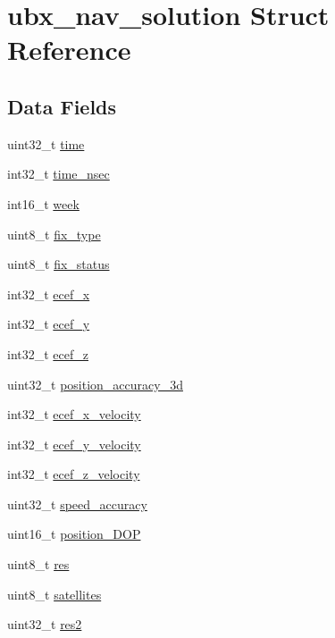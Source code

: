 \hypertarget{structubx__nav__solution}{\section{ubx\+\_\+nav\+\_\+solution Struct Reference}
\label{structubx__nav__solution}
}
\subsection*{Data Fields}
\begin{DoxyCompactItemize}
\item 
uint32\+\_\+t \hyperlink{structubx__nav__solution_aae9f8b563b5be705a41b809bc84149fe}{time}
\item 
int32\+\_\+t \hyperlink{structubx__nav__solution_a4ff7e85c5050ca078e2c3530dc25c5c3}{time\+\_\+nsec}
\item 
int16\+\_\+t \hyperlink{structubx__nav__solution_aebadda223c5339745fb587f467ebed19}{week}
\item 
uint8\+\_\+t \hyperlink{structubx__nav__solution_aca3f0fb879b28009e82b52f00da8876d}{fix\+\_\+type}
\item 
uint8\+\_\+t \hyperlink{structubx__nav__solution_ac83c394b99bbbf4276641083a2d5d4ce}{fix\+\_\+status}
\item 
int32\+\_\+t \hyperlink{structubx__nav__solution_a4a5ce8925bc08d5923aefe2b0c650517}{ecef\+\_\+x}
\item 
int32\+\_\+t \hyperlink{structubx__nav__solution_ae7f29c6a8efc32d5a4cb4b3b2a116b7c}{ecef\+\_\+y}
\item 
int32\+\_\+t \hyperlink{structubx__nav__solution_a0024a21981c386824ce143ea8e5d070d}{ecef\+\_\+z}
\item 
uint32\+\_\+t \hyperlink{structubx__nav__solution_ac2aaba4382313ea66376203f2c6b569e}{position\+\_\+accuracy\+\_\+3d}
\item 
int32\+\_\+t \hyperlink{structubx__nav__solution_a2f1bf45d4ea73aebc1e08c517576bf00}{ecef\+\_\+x\+\_\+velocity}
\item 
int32\+\_\+t \hyperlink{structubx__nav__solution_aab1257bb63b550dcf0f157ac531c5fe2}{ecef\+\_\+y\+\_\+velocity}
\item 
int32\+\_\+t \hyperlink{structubx__nav__solution_a9aca8140828792208974c62ceb9aa3b1}{ecef\+\_\+z\+\_\+velocity}
\item 
uint32\+\_\+t \hyperlink{structubx__nav__solution_af0ed47313a68d33f1dd7012d2373f274}{speed\+\_\+accuracy}
\item 
uint16\+\_\+t \hyperlink{structubx__nav__solution_a59c0af6aa34095acf0718be31309f12c}{position\+\_\+\+D\+O\+P}
\item 
uint8\+\_\+t \hyperlink{structubx__nav__solution_a6b1d87b638d21ecb888de65b11e73711}{res}
\item 
uint8\+\_\+t \hyperlink{structubx__nav__solution_afc4ea2c6d37e118558123d3e9e57699d}{satellites}
\item 
uint32\+\_\+t \hyperlink{structubx__nav__solution_a3e6f653c974887b1dc66c24fe0bc4fa2}{res2}
\end{DoxyCompactItemize}


